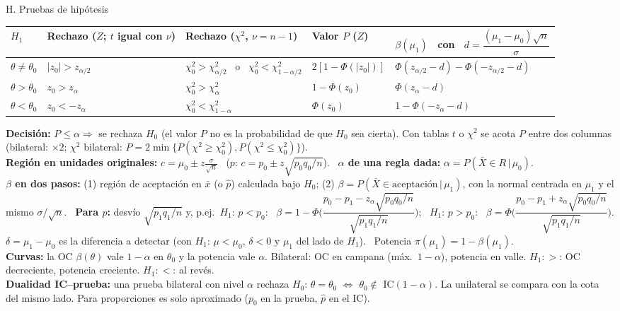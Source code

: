\documentclass[10pt,a4paper]{extarticle}
\newcommand{\xb}{\bar{x}}
\newcommand{\Xb}{\bar{X}}
\newcommand{\chis}{\chi^2}
\newcommand{\sq}[1]{\sqrt{#1}}
\begin{document}
\begin{hoja}{H. Pruebas de hipótesis}
\smallskip
\renewcommand{\arraystretch}{1.5}
\begin{tabular}{@{}>{\raggedright\arraybackslash}p{1.4cm}>{\raggedright\arraybackslash}p{2.9cm}>{\raggedright\arraybackslash}p{4.6cm}>{\raggedright\arraybackslash}p{2.9cm}>{\raggedright\arraybackslash}p{5.2cm}@{}}
\toprule
$H_1$ & Rechazo ($Z$; $t$ igual con $\nu$) & Rechazo ($\chis$, $\nu=n-1$) & Valor $P$ ($Z$) & $\beta(\mu_1)$ \ con \ $d=\dfrac{(\mu_1-\mu_0)\sq n}{\sigma}$\\\midrule
$\theta\neq\theta_0$ & $|z_0|>z_{\alpha/2}$ & $\chis_0>\chis_{\alpha/2}$ \ o \ $\chis_0<\chis_{1-\alpha/2}$ & $2[1-\Phi(|z_0|)]$ & $\Phi(z_{\alpha/2}-d)-\Phi(-z_{\alpha/2}-d)$\\
$\theta>\theta_0$ & $z_0>z_\alpha$ & $\chis_0>\chis_{\alpha}$ & $1-\Phi(z_0)$ & $\Phi(z_\alpha-d)$\\
$\theta<\theta_0$ & $z_0<-z_\alpha$ & $\chis_0<\chis_{1-\alpha}$ & $\Phi(z_0)$ & $1-\Phi(-z_\alpha-d)$\\
\bottomrule
\end{tabular}

\smallskip
\textbf{Decisión:} $P\le\alpha\Rightarrow$ se rechaza $H_0$ (el valor $P$ no es la probabilidad de que $H_0$ sea cierta). Con tablas $t$ o $\chis$ se acota $P$ entre dos columnas (bilateral: $\times2$; $\chis$ bilateral: $P=2\min\{P(\chis\ge\chis_0),P(\chis\le\chis_0)\}$).\\
\textbf{Región en unidades originales:} $c=\mu_0\pm z\frac{\sigma}{\sq n}$ \ ($p$: $c=p_0\pm z\sq{p_0q_0/n}$). \ \textbf{$\alpha$ de una regla dada:} $\alpha=P(\Xb\in R\,|\,\mu_0)$.\\
\textbf{$\beta$ en dos pasos:} (1) región de aceptación en $\xb$ (o $\hat p$) calculada bajo $H_0$; (2) $\beta=P(\Xb\in\text{aceptación}\,|\,\mu_1)$, con la normal centrada en $\mu_1$ y el mismo $\sigma/\sq n$. \ \textbf{Para $p$:} desvío $\sq{p_1q_1/n}$ y, p.ej.\ $H_1{:}\,p<p_0$: \ $\beta=1-\Phi\Big(\dfrac{p_0-p_1-z_\alpha\sq{p_0q_0/n}}{\sq{p_1q_1/n}}\Big)$; \ $H_1{:}\,p>p_0$: \ $\beta=\Phi\Big(\dfrac{p_0-p_1+z_\alpha\sq{p_0q_0/n}}{\sq{p_1q_1/n}}\Big)$.\\
$\delta=\mu_1-\mu_0$ es la diferencia a detectar (con $H_1{:}\,\mu<\mu_0$, $\delta<0$ y $\mu_1$ del lado de $H_1$). \ Potencia $\pi(\mu_1)=1-\beta(\mu_1)$.\\
\textbf{Curvas:} la OC $\beta(\theta)$ vale $1-\alpha$ en $\theta_0$ y la potencia vale $\alpha$. Bilateral: OC en campana (máx.\ $1-\alpha$), potencia en valle. $H_1{:}>$: OC decreciente, potencia creciente. $H_1{:}<$: al revés.\\
\textbf{Dualidad IC--prueba:} una prueba bilateral con nivel $\alpha$ rechaza $H_0{:}\,\theta=\theta_0$ $\iff$ $\theta_0\notin$ IC$(1-\alpha)$. La unilateral se compara con la cota del mismo lado. Para proporciones es solo aproximado ($p_0$ en la prueba, $\hat p$ en el IC).
\end{hoja}
\end{document}
